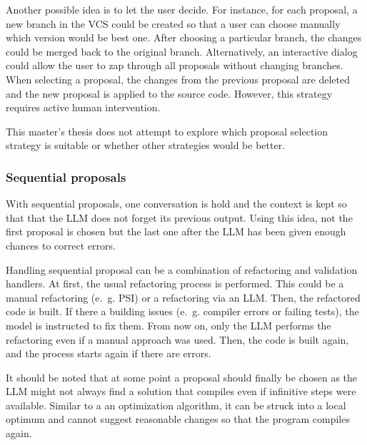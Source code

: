 Another possible idea is to let the user decide. For instance, for each proposal, a new branch in the \ac{VCS} could be created so that a user can choose manually which version would be best one. After choosing a particular branch, the changes could be merged back to the original branch. Alternatively, an interactive dialog  could allow the user to zap through all proposals without changing branches. When selecting a proposal, the changes from the previous proposal are deleted and the new proposal is applied to the source code. However, this strategy requires active human intervention. 

This master's thesis does not attempt to explore which proposal selection strategy is suitable or whether other strategies would be better. 

\subsubsection{Sequential proposals}

With sequential proposals, one conversation is hold and the context is kept so that that the \ac{LLM} does not forget its previous output. Using this idea, not the first proposal is chosen but the last one after the \ac{LLM} has been given enough chances to correct errors.

Handling sequential proposal can be a combination of refactoring and validation handlers. At first, the usual refactoring process is performed. This could be a manual refactoring (e.~g. PSI) or a refactoring via an \ac{LLM}. Then, the refactored code is built. If there a building issues (e.~g. compiler errors or failing tests), the model is instructed to fix them. From now on, only the \ac{LLM} performs the refactoring even if a manual approach was used. Then, the code is built again, and the process starts again if there are errors. 



It should be noted that at some point a proposal should finally be chosen as the \ac{LLM} might not always find a solution that compiles even if infinitive steps were available. Similar to a an optimization algorithm, it can be struck into a local optimum and cannot suggest reasonable changes so that the program compiles again.  